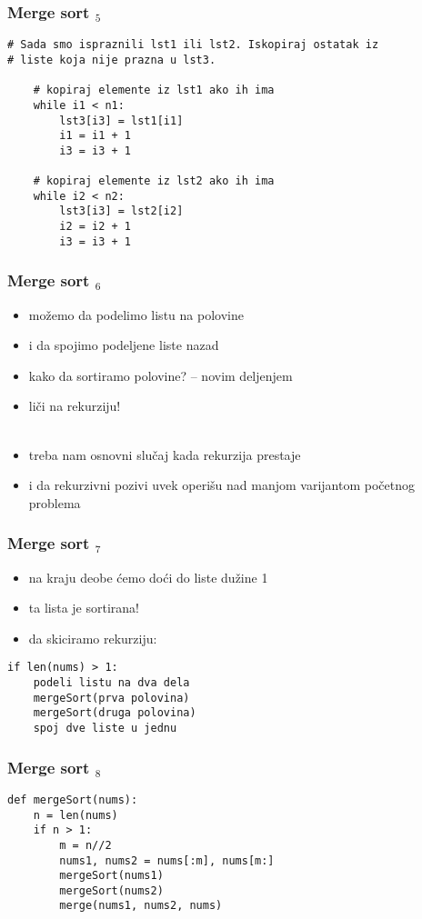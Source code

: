 \documentclass[utf8,compress,aspectratio=169]{beamer}
\begin{document}
\begin{frame}[fragile]
  \frametitle{Merge sort $_5$}
\begin{verbatim}
# Sada smo ispraznili lst1 ili lst2. Iskopiraj ostatak iz
# liste koja nije prazna u lst3.

    # kopiraj elemente iz lst1 ako ih ima
    while i1 < n1:
        lst3[i3] = lst1[i1]
        i1 = i1 + 1
        i3 = i3 + 1

    # kopiraj elemente iz lst2 ako ih ima
    while i2 < n2:
        lst3[i3] = lst2[i2]
        i2 = i2 + 1
        i3 = i3 + 1
\end{verbatim}
\end{frame}

\begin{frame}[fragile]
  \frametitle{Merge sort $_6$}
  \begin{itemize}
    \item možemo da podelimo listu na polovine
    \item i da spojimo podeljene liste nazad
    \item kako da sortiramo polovine? -- novim deljenjem
    \item liči na rekurziju! \\ \ \\
    \item treba nam osnovni slučaj kada rekurzija prestaje
    \item i da rekurzivni pozivi uvek operišu nad manjom varijantom početnog problema
  \end{itemize}
\end{frame}

\begin{frame}[fragile]
  \frametitle{Merge sort $_7$}
  \begin{itemize}
    \item na kraju deobe ćemo doći do liste dužine 1
    \item ta lista je sortirana!
    \item da skiciramo rekurziju:
  \end{itemize}
\begin{verbatim}
if len(nums) > 1:
    podeli listu na dva dela
    mergeSort(prva polovina)
    mergeSort(druga polovina)
    spoj dve liste u jednu
\end{verbatim}
\end{frame}

\begin{frame}[fragile]
  \frametitle{Merge sort $_8$}
\begin{verbatim}
def mergeSort(nums):
    n = len(nums)
    if n > 1:
        m = n//2
        nums1, nums2 = nums[:m], nums[m:]
        mergeSort(nums1)
        mergeSort(nums2)
        merge(nums1, nums2, nums)
\end{verbatim}
\end{frame}
\end{document}
